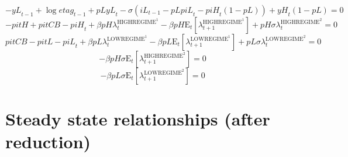 \begin{equation}
-{y\!L}_{t-1} + \log{{e\!t\!a\!g}_{t-1}} + {{p\!L}} {{y\!L}_{t}} - {\sigma} \left({i\!L}_{t-1} - {{p\!L}} {{p\!i\!L}_{t}} - {{p\!i\!H}_{t}} \left(1 - {p\!L}\right)\right) + {{y\!H}_{t}} \left(1 - {p\!L}\right) = 0
\end{equation}
\begin{equation}
-{p\!i\!t\!H} + {p\!i\!t\!C\!B} - {p\!i\!H}_{t} + {\beta} {{p\!H}} {\lambda^{\mathrm{HIGHREGIME}^{\mathrm{1}}}_{t}} - {\beta} {{p\!H}} {\mathrm{E}_{t}\left[\lambda^{\mathrm{HIGHREGIME}^{\mathrm{1}}}_{t+1}\right]} + {{p\!H}} {\sigma} {\lambda^{\mathrm{HIGHREGIME}^{\mathrm{2}}}_{t}} = 0
\end{equation}
\begin{equation}
{p\!i\!t\!C\!B} - {p\!i\!t\!L} - {p\!i\!L}_{t} + {\beta} {{p\!L}} {\lambda^{\mathrm{LOWREGIME}^{\mathrm{1}}}_{t}} - {\beta} {{p\!L}} {\mathrm{E}_{t}\left[\lambda^{\mathrm{LOWREGIME}^{\mathrm{1}}}_{t+1}\right]} + {{p\!L}} {\sigma} {\lambda^{\mathrm{LOWREGIME}^{\mathrm{2}}}_{t}} = 0
\end{equation}
\begin{equation}
-{\beta} {{p\!H}} {\sigma} {\mathrm{E}_{t}\left[\lambda^{\mathrm{HIGHREGIME}^{\mathrm{2}}}_{t+1}\right]} = 0
\end{equation}
\begin{equation}
-{\beta} {{p\!L}} {\sigma} {\mathrm{E}_{t}\left[\lambda^{\mathrm{LOWREGIME}^{\mathrm{2}}}_{t+1}\right]} = 0
\end{equation}



\section{Steady state relationships (after reduction)}

